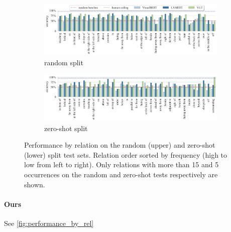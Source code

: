 \begin{figure}
    \centering
\begin{subfigure}[b]{\linewidth}
    \centering
    \includegraphics[width=\linewidth]{images/visual-spatial-reasoning/performance_by_relation_random_split_v2.png}
    \vspace{-1cm}
    \caption{random split}
\end{subfigure}
\begin{subfigure}[b]{\linewidth}
    \centering
    \includegraphics[width=\linewidth]{images/visual-spatial-reasoning/performance_by_relation_zeroshot_split_v2.png}
    \vspace{-1cm}
    \caption{zero-shot split}
\end{subfigure}
\caption{Performance by relation on the random (upper) and zero-shot (lower) split test sets. Relation order sorted by frequency (high to low from left to right). Only relations with more than 15 and 5 occurrences on the random and zero-shot tests respectively are shown. }
    \label{fig:performance_by_rel_base}
\end{figure}

\paragraph{Ours}

See \cref{fig:performance_by_rel}


